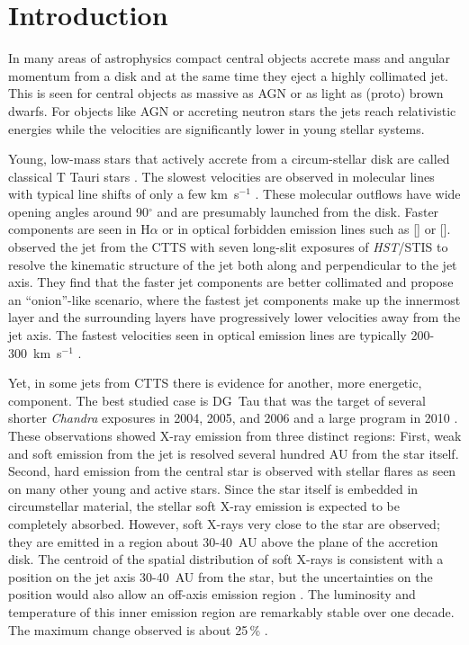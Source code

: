 \section{Introduction} 
In many areas of astrophysics compact central objects accrete mass and angular momentum from a disk and at the same time they eject a highly collimated jet. This is seen for central objects as massive as AGN or as light as (proto) brown dwarfs. For objects like AGN or accreting neutron stars the jets reach relativistic energies while the velocities are significantly lower in young stellar systems. 

Young, low-mass stars that actively accrete from a circum-stellar disk are called classical T Tauri stars \citep[for a review see][]{2013AN....334...67G}. The slowest velocities are observed in molecular lines with typical line shifts of only a few km~s$^{-1}$ \citep{2008ApJ...676..472B}. These molecular outflows have wide opening angles around 90$^{\circ}$ \citep[e.g.][]{2013A&A...557A.110S,2014A&A...564A..11A} and are presumably launched from the disk. Faster components are seen in H$\alpha$ or in optical forbidden emission lines such as [] or []. \citet{2000ApJ...537L..49B} observed the jet from the CTTS  with seven long-slit exposures of \emph{HST}/STIS to resolve the kinematic structure of the jet both along and perpendicular to the jet axis. They find that the faster jet components are better collimated and propose an ``onion''-like scenario, where the fastest jet components make up the innermost layer and the surrounding layers have progressively lower velocities away from the jet axis. The fastest velocities seen in optical emission lines are typically 200-300~km~s$^{-1}$ \citep{2004Ap&SS.292..651B,2008ApJ...689.1112C,2013A&A...550L...1S}.

Yet, in some jets from CTTS there is evidence for another, more energetic, component. The best studied case is DG~Tau that was the target of several shorter \emph{Chandra} exposures in 2004, 2005, and 2006 and a large program in 2010 \citep{2005ApJ...626L..53G,2008A&A...478..797G,2011ASPC..448..617G}. These observations showed X-ray emission from three distinct regions: First, weak and soft emission from the jet is resolved several hundred AU from the star itself. Second, hard emission from the central star is observed with stellar flares as seen on many other young and active stars. Since the star itself is embedded in circumstellar material, the stellar soft X-ray emission is expected to be completely absorbed. However, soft X-rays very close to the star are observed; they are emitted in a region about 30-40~AU above the plane of the accretion disk. The centroid of the spatial distribution of soft X-rays is consistent with a position on the jet axis 30-40~AU from the star, but the uncertainties on the position would also allow an off-axis emission region \citep{2008A&A...488L..13S}. The luminosity and temperature of this inner emission region are remarkably stable over one decade. The maximum change observed is about 25\,\% \citep{SchneiderDGTauXray}.

